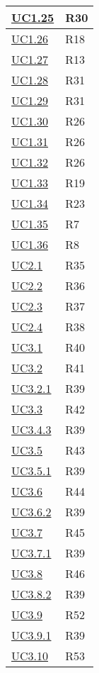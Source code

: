 \begin{longtable}{|P{6cm}|P{6cm}|}
	\hline \hyperref[UC1.25]{UC1.25} & R30 \\
	\hline \hyperref[UC1.26]{UC1.26} & R18 \\
	\hline \hyperref[UC1.27]{UC1.27} & R13 \\
	\hline \hyperref[UC1.28]{UC1.28} & R31 \\
	\hline \hyperref[UC1.29]{UC1.29} & R31 \\
	\hline \hyperref[UC1.30]{UC1.30} & R26 \\
	\hline \hyperref[UC1.31]{UC1.31} & R26 \\
	\hline \hyperref[UC1.32]{UC1.32} & R26 \\
	\hline \hyperref[UC1.33]{UC1.33} & R19 \\
	\hline \hyperref[UC1.34]{UC1.34} & R23 \\
	\hline \hyperref[UC1.35]{UC1.35} & R7 \\
	\hline \hyperref[UC1.36]{UC1.36} & R8 \\	
	\hline \hyperref[UC2.1]{UC2.1} & R35 \\
	\hline \hyperref[UC2.2]{UC2.2} & R36 \\
	\hline \hyperref[UC2.3]{UC2.3} & R37 \\
	\hline \hyperref[UC2.4]{UC2.4} & R38 \\	
	\hline \hyperref[UC3.1]{UC3.1} & R40 \\
	\hline \hyperref[UC3.2]{UC3.2} & R41 \\
	\hline \hyperref[UC3.2.1]{UC3.2.1} & R39 \\
	\hline \hyperref[UC3.3]{UC3.3} & R42 \\
	\hline \hyperref[UC3.4.3]{UC3.4.3} & R39 \\
	\hline \hyperref[UC3.5]{UC3.5} & R43 \\
	\hline \hyperref[UC3.5.1]{UC3.5.1} & R39 \\
	\hline \hyperref[UC3.6]{UC3.6} & R44 \\
	\hline \hyperref[UC3.6.2]{UC3.6.2} & R39 \\
	\hline \hyperref[UC3.7]{UC3.7} & R45 \\
	\hline \hyperref[UC3.7.1]{UC3.7.1} & R39 \\
	\hline \hyperref[UC3.8]{UC3.8} & R46 \\
	\hline \hyperref[UC3.8.2]{UC3.8.2} & R39 \\
	\hline \hyperref[UC3.9]{UC3.9} & R52 \\
	\hline \hyperref[UC3.9.1]{UC3.9.1} & R39 \\
	\hline \hyperref[UC3.10]{UC3.10} & R53 \\

\end{longtable}
